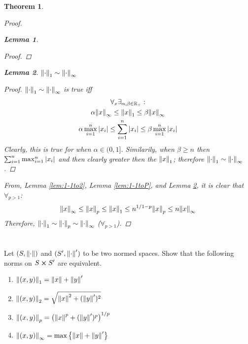 \documentclass[]{article}
\newcommand{\R}{\mathbb{R}}
\newtheorem{theorem}{Theorem}
\newtheorem{lemma}{Lemma}
\begin{document}
\begin{theorem}
\begin{proof}
\begin{lemma}
\begin{proof}
            \end{proof}
        \end{lemma}
        \begin{lemma}\label{lem:1-1toInfty}
            $\norm{\cdot}_1 \sim \norm{\cdot}_\infty$
            \begin{proof}
                $\norm{\cdot}_1 \sim \norm{\cdot}_\infty$ is true iff
                \begin{multline*} 
                    \forall_{x} \exists_{\alpha,\beta \in \R_+} :\\
                    \alpha \norm{x}_\infty \leq \norm{x}_1 \leq \beta \norm{x}_\infty\\
                    \alpha \max_{i=1}^n \abs{x_i} \leq \sum_{i=1}^n \abs{x_i} \leq \beta \max_{i=1}^n \abs{x_i}\\
                \end{multline*}
                Clearly, this is true for when $\alpha \in (0,1]$. Similarily, when $\beta \geq n$ then $\sum_{i=1}^n \max_{i=1}^n \abs{x_i}$ and then clearly greater then the $\norm{x}_1$; therefore $\norm{\cdot}_1 \sim \norm{\cdot}_\infty$.
            \end{proof}
        \end{lemma}
        From, Lemma \ref{lem:1-1to2}, Lemma \ref{lem:1-1toP}, and Lemma \ref{lem:1-1toInfty}, it is clear that $\forall_{p > 1}$:
        \[
            \norm{x}_\infty 
            \leq \norm{x}_p 
            \leq \norm{x}_1 
            \leq n^{1/{1-p}} \norm{x}_p 
            \leq n \norm{x}_\infty
        \]
        Therefore, $\norm{\cdot}_1 \sim \norm{\cdot}_p \sim \norm{\cdot}_\infty$ ($\forall_{p > 1}$).
    \end{proof}
\end{theorem}

\newpage
\section{}
Let $(S, \norm{\cdot})$ and $(S', \norm{\cdot}')$ to be two normed spaces. 
Show that the following norms on $S \cross S'$ are equivalent.
\begin{enumerate}
    \item $\norm{(x,y)}_1 = \norm{x} + \norm{y}'$
    \item $\norm{(x,y)}_2 = \sqrt{\norm{x}^2 + (\norm{y}')^2}$
    \item $\norm{(x,y)}_p = \qty(\norm{x}^p + (\norm{y}')^p)^{1/p}$
    \item $\norm{(x,y)}_\infty = \max\qty{\norm{x} + \norm{y}'}$
\end{enumerate}
\end{document}
